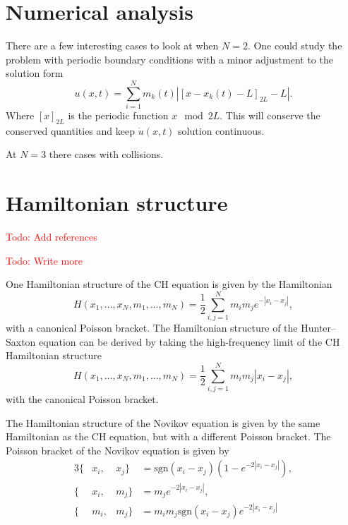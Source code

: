 \documentclass[english,master]{liumaiex}
\theoremstyle{plain}
\theoremstyle{definition}
\newcommand\todo[1]{\textcolor{red}{#1}}
\newcommand{\sgn}{\text{sgn}}
\begin{document}

\section{Numerical analysis} \label{sec:Numerical}

There are a few interesting cases to look at when $N = 2$. One could study the problem with periodic boundary conditions with a minor adjustment to the solution form
\begin{equation}
	u(x, t) = \sum_{i = 1}^{N} m_k(t) |[x - x_k(t) - L]_{2L} - L|.
\end{equation}
Where $[x]_{2L}$ is the periodic function $x \mod 2L$. This will conserve the conserved quantities and keep $\dot{u}(x,t)$ solution continuous.

At $N = 3$ there cases with collisions.


\section{Hamiltonian structure}
\todo{Todo: Add references}

\todo{Todo: Write more}

One Hamiltonian structure of the CH equation is given by the Hamiltonian
\begin{equation}
	H(x_1, \dots, x_N, m_1, \dots, m_N) = \frac{1}{2} \sum_{i,j = 1}^{N} m_i m_j e^{-|x_i - x_j|},
\end{equation}
with a canonical Poisson bracket. The Hamiltonian structure of the Hunter--Saxton equation can be derived by taking the high-frequency limit of the CH Hamiltonian structure
\begin{equation}
	H(x_1, \dots, x_N, m_1, \dots, m_N) = \frac{1}{2} \sum_{i,j = 1}^{N} m_i m_j |x_i - x_j|,
\end{equation}
with the canonical Poisson bracket.

The Hamiltonian structure of the Novikov equation is given by the same Hamiltonian as the CH equation, but with a different Poisson bracket. The Poisson bracket of the Novikov equation is given by
\begin{alignat}{3}
	\{&x_i, &x_j\} &= \sgn(x_i - x_j)(1 - e^{-2|x_i - x_j|}), \\
	\{&x_i, &m_j\} &= m_j e^{-2|x_i - x_j|}, \\
	\{&m_i, &m_j\} &= m_i m_j \sgn(x_i - x_j)e^{-2|x_i - x_j|}
\end{alignat}
\end{document}
